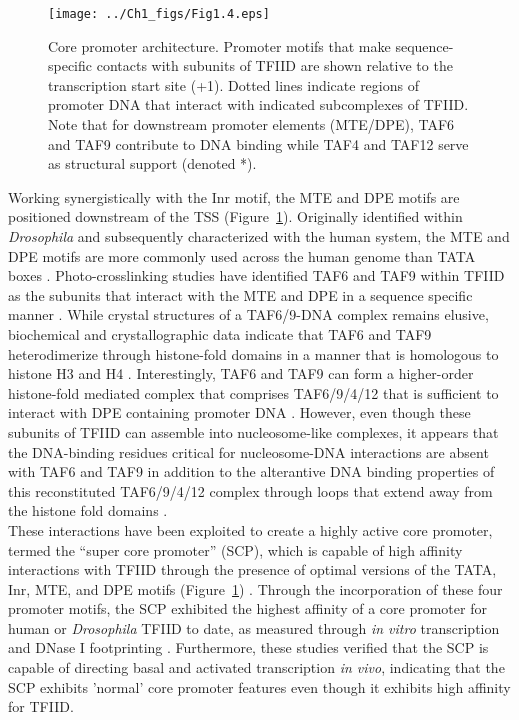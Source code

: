 \begin{figure}
\centering
\texttt{[image: ../Ch1\_figs/Fig1.4.eps]}
\caption[Core promoter architecture]{Core promoter architecture. Promoter motifs that make sequence-specific contacts with subunits of TFIID are shown relative to the transcription start site (+1).  Dotted lines indicate regions of promoter DNA that interact with indicated subcomplexes of TFIID.  Note that for downstream promoter elements (MTE/DPE), TAF6 and TAF9 contribute to DNA binding while TAF4 and TAF12 serve as structural support (denoted *).}
\label{fig:Fig1.4}
\end{figure}
\indent Working synergistically with the Inr motif, the MTE and DPE motifs are positioned downstream of the TSS (Figure~\ref{fig:Fig1.4}). Originally identified within \emph{Drosophila} and subsequently characterized with the human system, the MTE and DPE motifs are more commonly used across the human genome than TATA boxes \cite{Kim_1387}. Photo-crosslinking studies have identified TAF6 and TAF9 within TFIID as the subunits that interact with the MTE and DPE in a sequence specific manner \cite{Burke_2739,Lim_1522}. While crystal structures of a TAF6/9-DNA complex remains elusive, biochemical and crystallographic data indicate that TAF6 and TAF9 heterodimerize through histone-fold domains in a manner that is homologous to histone H3 and H4 \cite{Xie_2805,Hoffmann_2911}. Interestingly, TAF6 and TAF9 can form a higher-order histone-fold mediated complex that comprises TAF6/9/4/12 that is sufficient to interact with DPE containing promoter DNA \cite{Shao_1340}. However, even though these subunits of TFIID can assemble into nucleosome-like complexes, it appears that the DNA-binding residues critical for nucleosome-DNA interactions are absent with TAF6 and TAF9 in addition to the alterantive DNA binding properties of this reconstituted TAF6/9/4/12 complex through loops that extend away from the histone fold domains \cite{Shao_1340}. \\
\indent These interactions have been exploited to create a highly active core promoter, termed the “super core promoter” (SCP), which is capable of high affinity interactions with TFIID through the presence of optimal versions of the TATA, Inr, MTE, and DPE motifs (Figure~\ref{fig:Fig1.4}) \cite{Juven-Gershon_1249}. Through the incorporation of these four promoter motifs, the SCP exhibited the highest affinity of a core promoter for human or \emph{Drosophila} TFIID to date, as measured through \emph{in vitro} transcription and DNase I footprinting \cite{Juven-Gershon_1249}. Furthermore, these studies verified that the SCP is capable of directing basal and activated transcription \emph{in vivo}, indicating that the SCP exhibits 'normal' core promoter features even though it exhibits high affinity for TFIID. 




